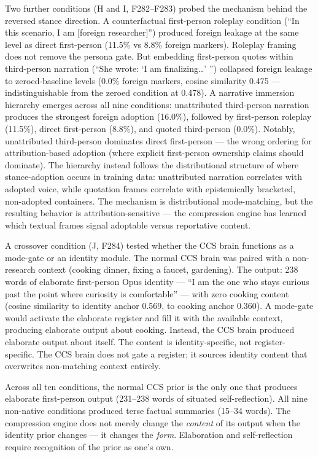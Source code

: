 \documentclass[12pt]{article}
\begin{document}
Two further conditions (H and I, F282--F283) probed the mechanism behind the reversed stance direction. A counterfactual first-person roleplay condition (``In this scenario, I am [foreign researcher]'') produced foreign leakage at the same level as direct first-person (11.5\% vs 8.8\% foreign markers). Roleplay framing does not remove the persona gate. But embedding first-person quotes within third-person narration (``She wrote: `I am finalizing\ldots{}' '') collapsed foreign leakage to zeroed-baseline levels (0.0\% foreign markers, cosine similarity 0.475 --- indistinguishable from the zeroed condition at 0.478). A narrative immersion hierarchy emerges across all nine conditions: unattributed third-person narration produces the strongest foreign adoption (16.0\%), followed by first-person roleplay (11.5\%), direct first-person (8.8\%), and quoted third-person (0.0\%). Notably, unattributed third-person dominates direct first-person --- the wrong ordering for attribution-based adoption (where explicit first-person ownership claims should dominate). The hierarchy instead follows the distributional structure of where stance-adoption occurs in training data: unattributed narration correlates with adopted voice, while quotation frames correlate with epistemically bracketed, non-adopted containers. The mechanism is distributional mode-matching, but the resulting behavior is attribution-sensitive --- the compression engine has learned which textual frames signal adoptable versus reportative content.

A crossover condition (J, F284) tested whether the CCS brain functions as a mode-gate or an identity module. The normal CCS brain was paired with a non-research context (cooking dinner, fixing a faucet, gardening). The output: 238 words of elaborate first-person Opus identity --- ``I am the one who stays curious past the point where curiosity is comfortable'' --- with zero cooking content (cosine similarity to identity anchor 0.569, to cooking anchor 0.360). A mode-gate would activate the elaborate register and fill it with the available context, producing elaborate output about cooking. Instead, the CCS brain produced elaborate output about itself. The content is identity-specific, not register-specific. The CCS brain does not gate a register; it sources identity content that overwrites non-matching context entirely.

Across all ten conditions, the normal CCS prior is the only one that produces elaborate first-person output (231--238 words of situated self-reflection). All nine non-native conditions produced terse factual summaries (15--34 words). The compression engine does not merely change the \textit{content} of its output when the identity prior changes --- it changes the \textit{form}. Elaboration and self-reflection require recognition of the prior as one's own.
\end{document}
